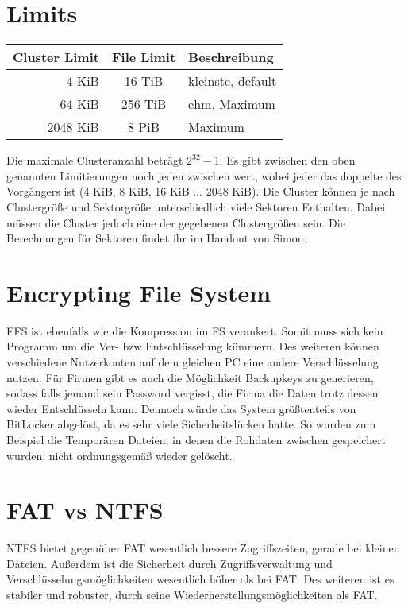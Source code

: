 \documentclass[11pt,a4paper]{article}
\begin{document}
\section{Limits}
\begin{table}[h!]
\centering
\begin{tabular}{r|c|l}
\Large Cluster Limit & \Large File Limit & \Large Beschreibung\\
\hline
4 KiB & 16 TiB & kleinste, default\\
64 KiB & 256 TiB & ehm. Maximum\\
2048 KiB & 8 PiB & Maximum
\end{tabular}
\end{table}
\newpage
Die maximale Clusteranzahl beträgt $2^{32}-1$. Es gibt zwischen den oben genannten Limitierungen noch jeden zwischen wert, wobei jeder das doppelte des Vorgängers ist (4 KiB, 8 KiB, 16 KiB ... 2048 KiB). Die Cluster können je nach Clustergröße und Sektorgröße unterschiedlich viele Sektoren Enthalten. Dabei müssen die Cluster jedoch eine der gegebenen Clustergrößen sein. Die Berechnungen für Sektoren findet ihr im Handout von Simon. 

\section{Encrypting File System}
EFS ist ebenfalls wie die Kompression im FS verankert. Somit muss sich kein Programm um die Ver- bzw Entschlüsselung kümmern. Des weiteren können verschiedene Nutzerkonten auf dem gleichen PC eine andere Verschlüsselung nutzen. Für Firmen gibt es auch die Möglichkeit Backupkeys zu generieren, sodass falls jemand sein Password vergisst, die Firma die Daten trotz dessen wieder Entschlüsseln kann. Dennoch würde das System größtenteils von BitLocker abgelöst, da es sehr viele Sicherheitslücken hatte. So wurden zum Beispiel die Temporären Dateien, in denen die Rohdaten zwischen gespeichert wurden, nicht ordnungsgemäß wieder gelöscht.

\section{FAT vs NTFS}
NTFS bietet gegenüber FAT wesentlich bessere Zugriffszeiten, gerade bei kleinen Dateien. Außerdem ist die Sicherheit durch Zugriffsverwaltung und Verschlüsselungsmöglichkeiten wesentlich höher als bei FAT. Des weiteren ist es stabiler und robuster, durch seine Wiederherstellungsmöglichkeiten als FAT.
\end{document}
